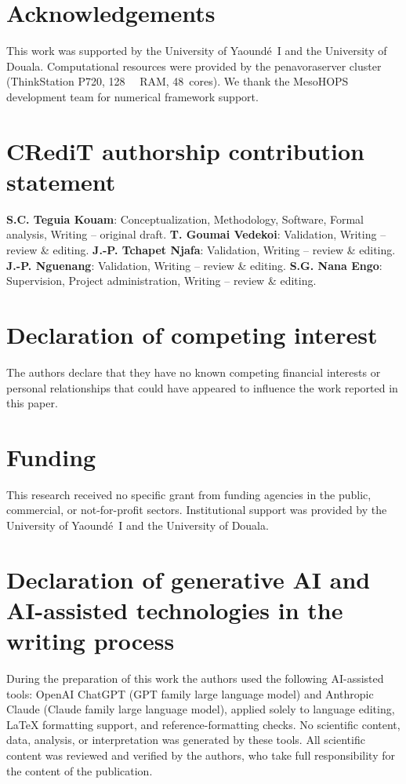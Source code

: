 \documentclass[preprint,12pt]{elsarticle}
\begin{document}
\section*{Acknowledgements}
This work was supported by the University of Yaound\'{e}~I and the University of Douala.
Computational resources were provided by the penavoraserver cluster (ThinkStation P720, \qty{128}{\giga\byte} RAM, 48~cores).
We thank the MesoHOPS development team for numerical framework support.

\section*{CRediT authorship contribution statement}
\textbf{S.C. Teguia Kouam}: Conceptualization, Methodology, Software, Formal analysis, Writing -- original draft.
\textbf{T. Goumai Vedekoi}: Validation, Writing -- review \& editing.
\textbf{J.-P. Tchapet Njafa}: Validation, Writing -- review \& editing.
\textbf{J.-P. Nguenang}: Validation, Writing -- review \& editing.
\textbf{S.G. Nana Engo}: Supervision, Project administration, Writing -- review \& editing.

\section*{Declaration of competing interest}
The authors declare that they have no known competing financial interests or personal relationships that could have appeared to influence the work reported in this paper.

\section*{Funding}
This research received no specific grant from funding agencies in the public, commercial, or not-for-profit sectors. Institutional support was provided by the University of Yaound\'{e}~I and the University of Douala.

\section*{Declaration of generative AI and AI-assisted technologies in the writing process}
During the preparation of this work the authors used the following AI-assisted tools: OpenAI ChatGPT (GPT family large language model) and Anthropic Claude (Claude family large language model), applied solely to language editing, LaTeX formatting support, and reference-formatting checks. No scientific content, data, analysis, or interpretation was generated by these tools. All scientific content was reviewed and verified by the authors, who take full responsibility for the content of the publication.
\end{document}
